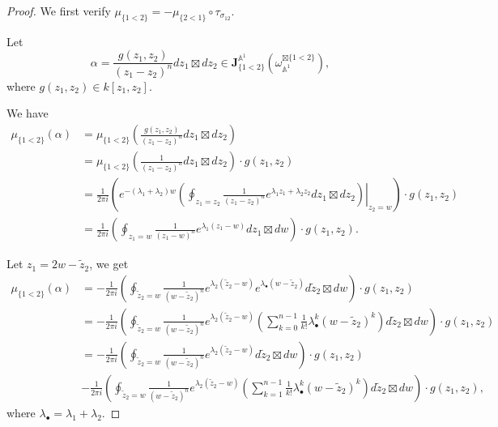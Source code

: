 \documentclass[11pt]{amsart}
\theoremstyle{definition}
\theoremstyle{remark}
\numberwithin{equation}{section}
\begin{document}
\begin{proof}
    We first verify $\mu_{\{1<2\}}=-\mu_{\{2<1\}}\circ \tau_{\sigma_{12}}$.
    
    Let 
$$\alpha=\frac{g(z_{1},z_{2})}{(z_{1}-z_{2})^{n}}dz_{1}\boxtimes dz_{2}\in \mathbf{J}^{\mathbb{A}^1}_{\{1<2\}}(\omega_{\mathbb{A}^1}^{\boxtimes\{1<2\}}),
$$
where $g(z_{1},z_{2})\in k[z_{1},z_{2}]$. 

We have
\begin{align*}
    \mu_{\{1<2\}}(\alpha)
    &=
    \mu_{\{1<2\}}(\frac{g(z_{1},z_{2})}{(z_{1}-z_{2})^{n}}dz_{1}\boxtimes dz_{2})\\
    &=
    \mu_{\{1<2\}}(\frac{1}{(z_{1}-z_{2})^{n}}dz_{1}\boxtimes dz_{2})\cdot g(z_{1},z_{2})\\
    &=
    \frac{1}{2\pi i}\left(e^{-(\lambda_{1}+\lambda_{2})w}\left. \left(\oint_{z_{1}=z_2}\frac{1}{(z_{1}-z_{2})^{n}}e^{\lambda_{1}z_{1}+\lambda_{2}z_{2}}dz_{1}\boxtimes dz_{2}\right)\right|_{z_{2}=w}\right)\cdot g(z_{1},z_{2})\\
    &=
     \frac{1}{2\pi i}\left(\oint_{z_{1}=w}\frac{1}{(z_{1}-w)^{n}}e^{\lambda_{1}(z_{1}-w)}dz_{1}\boxtimes dw\right)\cdot g(z_{1},z_{2}).
\end{align*}

Let $z_{1}=2w-\tilde{z}_2$, we get
\begin{align*}
    \mu_{\{1<2\}}(\alpha)
    &=
    -\frac{1}{2\pi i}\left(\oint_{\tilde{z}_{2}=w}\frac{1}{(w-\tilde{z}_{2})^{n}}e^{\lambda_{2}(\tilde{z}_{2}-w)}e^{\lambda_{\bullet}(w-\tilde{z}_{2})}d\tilde{z}_{2}\boxtimes dw\right)\cdot g(z_{1},z_{2})\\
    &=
     -\frac{1}{2\pi i}\left(\oint_{\tilde{z}_{2}=w}\frac{1}{(w-\tilde{z}_{2})^{n}}e^{\lambda_{2}(\tilde{z}_{2}-w)}\left(\sum_{k=0}^{n-1}\frac{1}{k!}\lambda_{\bullet}^{k}(w-\tilde{z}_{2})^{k} \right)d\tilde{z}_{2}\boxtimes dw\right)\cdot g(z_{1},z_{2})\\
     &=
      -\frac{1}{2\pi i}\left(\oint_{\tilde{z}_{2}=w}\frac{1}{(w-\tilde{z}_{2})^{n}}e^{\lambda_{2}(\tilde{z}_{2}-w)}d\tilde{z}_{2}\boxtimes dw\right)\cdot g(z_{1},z_{2})\\
      &-
     \frac{1}{2\pi i}\left(\oint_{\tilde{z}_{2}=w}\frac{1}{(w-\tilde{z}_{2})^{n}}e^{\lambda_{2}(\tilde{z}_{2}-w)}\left(\sum_{k=1}^{n-1}\frac{1}{k!}\lambda_{\bullet}^{k}(w-\tilde{z}_{2})^{k} \right)d\tilde{z}_{2}\boxtimes dw\right)\cdot g(z_{1},z_{2}),
\end{align*}
where $\lambda_{\bullet}=\lambda_{1}+\lambda_{2}$.


\end{proof}
\end{document}
